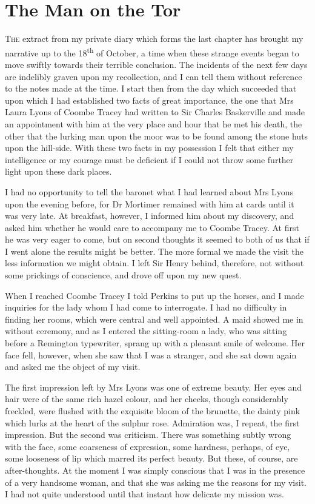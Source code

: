 \chapter{The Man on the Tor}
\lettrine[lines=1]{T}{he} extract from my private diary which forms the last chap\-ter has brought my narrative up to the 18\textsuperscript{th} of October, a time when these strange events began to move swiftly towards their terrible conclusion. The incidents of the next few days are indelibly graven upon my recollection, and I can tell them without reference to the notes made at the time. I start then from the day which succeeded that upon which I had established two facts of great importance, the one that Mrs Laura Lyons of Coombe Tracey had written to Sir Charles Baskerville and made an appointment with him at the very place and hour that he met his death, the other that the lurking man upon the moor was to be found among the stone huts upon the hill-side. With these two facts in my possession I felt that either my intelligence or my courage must be deficient if I could not throw some further light upon these dark places.

I had no opportunity to tell the baronet what I had learned about Mrs Lyons upon the evening before, for Dr Mortimer remained with him at cards until it was very late. At breakfast, however, I informed him about my discovery, and asked him whether he would care to accompany me to Coombe Tracey. At first he was very eager to come, but on second thoughts it seemed to both of us that if I went alone the results might be better. The more formal we made the visit the less information we might obtain. I left Sir Henry behind, therefore, not without some prickings of conscience, and drove off upon my new quest.

When I reached Coombe Tracey I told Perkins to put up the horses, and I made inquiries for the lady whom I had come to interrogate. I had no difficulty in finding her rooms, which were central and well appointed. A maid showed me in without ceremony, and as I entered the sitting-room a lady, who was sitting before a Remington typewriter, sprang up with a pleasant smile of welcome. Her face fell, however, when she saw that I was a stranger, and she sat down again and asked me the object of my visit.

The first impression left by Mrs Lyons was one of extreme beau\-ty. Her eyes and hair were of the same rich hazel colour, and her cheeks, though considerably freckled, were flushed with the exquisite bloom of the brunette, the dainty pink which lurks at the heart of the sulphur rose. Admiration was, I repeat, the first impression. But the second was criticism. There was something subtly wrong with the face, some coarseness of expression, some hardness, perhaps, of eye, some looseness of lip which marred its perfect beauty. But these, of course, are after-thoughts. At the moment I was simply conscious that I was in the presence of a very handsome woman, and that she was asking me the reasons for my visit. I had not quite understood until that instant how delicate my mission was.

